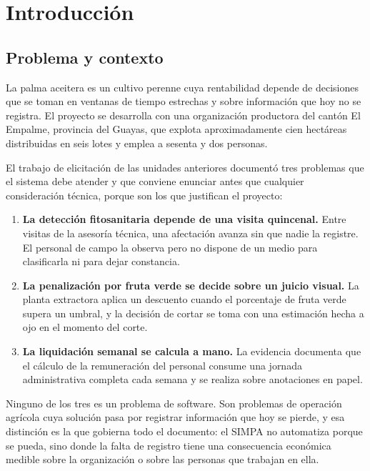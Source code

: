 \section{Introducción}
\label{sec:intro}

\subsection{Problema y contexto}

La palma aceitera es un cultivo perenne cuya rentabilidad depende de decisiones que se toman en
ventanas de tiempo estrechas y sobre información que hoy no se registra. El proyecto se desarrolla
con una organización productora del cantón El Empalme, provincia del Guayas, que explota
aproximadamente cien hectáreas distribuidas en seis lotes y emplea a sesenta y dos personas.

El trabajo de elicitación de las unidades anteriores documentó tres problemas que el sistema debe
atender y que conviene enunciar antes que cualquier consideración técnica, porque son los que
justifican el proyecto:

\begin{enumerate}[leftmargin=*, nosep]
  \item \textbf{La detección fitosanitaria depende de una visita quincenal.} Entre visitas de la
        asesoría técnica, una afectación avanza sin que nadie la registre. El personal de campo la
        observa pero no dispone de un medio para clasificarla ni para dejar constancia.
  \item \textbf{La penalización por fruta verde se decide sobre un juicio visual.} La planta
        extractora aplica un descuento cuando el porcentaje de fruta verde supera un umbral, y la
        decisión de cortar se toma con una estimación hecha a ojo en el momento del corte.
  \item \textbf{La liquidación semanal se calcula a mano.} La evidencia  documenta que el
        cálculo de la remuneración del personal consume una jornada administrativa completa cada
        semana y se realiza sobre anotaciones en papel.
\end{enumerate}

Ninguno de los tres es un problema de software. Son problemas de operación agrícola cuya solución
pasa por registrar información que hoy se pierde, y esa distinción es la que gobierna todo el
documento: el SIMPA no automatiza porque se pueda, sino donde la falta de registro tiene una
consecuencia económica medible sobre la organización o sobre las personas que trabajan en ella.


